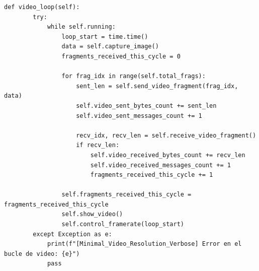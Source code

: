 \begin{lstlisting}[style=pythonstyle, caption={Método \texttt{video\_loop()} de \textit{Minimal\_Video\_Resolution\_verbose}.}, label={lst:video_loop_minimal_video_resolution_verbose}]
def video_loop(self):
        try:
            while self.running:
                loop_start = time.time()
                data = self.capture_image()
                fragments_received_this_cycle = 0

                for frag_idx in range(self.total_frags):
                    sent_len = self.send_video_fragment(frag_idx, data)
                    self.video_sent_bytes_count += sent_len
                    self.video_sent_messages_count += 1

                    recv_idx, recv_len = self.receive_video_fragment()
                    if recv_len:
                        self.video_received_bytes_count += recv_len
                        self.video_received_messages_count += 1
                        fragments_received_this_cycle += 1

                self.fragments_received_this_cycle = fragments_received_this_cycle
                self.show_video()
                self.control_framerate(loop_start)
        except Exception as e:
            print(f"[Minimal_Video_Resolution_Verbose] Error en el bucle de video: {e}")
            pass
\end{lstlisting}
\vspace{\baselineskip}

